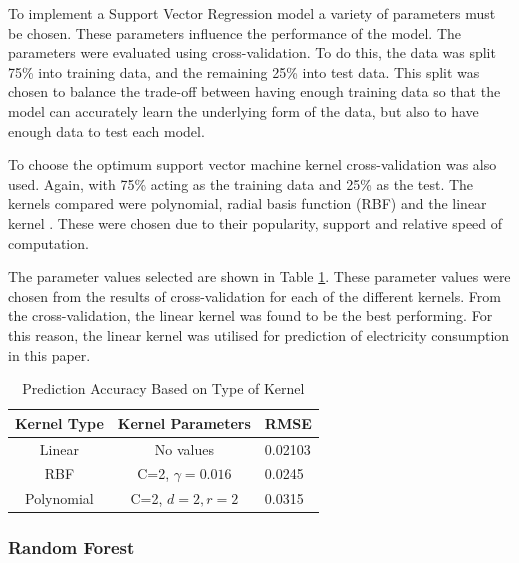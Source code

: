 To implement a Support Vector Regression model a variety of parameters must be chosen. These parameters influence the performance of the model. The parameters were evaluated using cross-validation. To do this, the data was split 75\% into training data, and the remaining 25\% into test data. This split was chosen to balance the trade-off between having enough training data so that the model can accurately learn the underlying form of the data, but also to have enough data to test each model.

To choose the optimum support vector machine kernel cross-validation was also used. Again, with 75\% acting as the training data and 25\% as the test. The kernels compared were polynomial, radial basis function (RBF) and the linear kernel \cite{Chang2010, theodoridis2009pattern}. These were chosen due to their popularity, support and relative speed of computation.

The parameter values selected are shown in Table \ref{tab:kernel}. These parameter values were chosen from the results of cross-validation for each of the different kernels.  From the cross-validation, the linear kernel was found to be the best performing. For this reason, the linear kernel was utilised for prediction of electricity consumption in this paper.

\begin{table}
	\caption{Prediction Accuracy Based on Type of Kernel}
	\label{tab:kernel}
	\begin{tabular}{ccl}
		\toprule
		Kernel Type& Kernel Parameters & RMSE\\
		\midrule
		Linear & No values & 0.02103\\
		RBF & C=2, $\gamma=0.016$ & 0.0245\\
		Polynomial & C=2, $d=2, r=2$ & 0.0315 \\
		\bottomrule
	\end{tabular}
\end{table}


\subsubsection{Random Forest}


